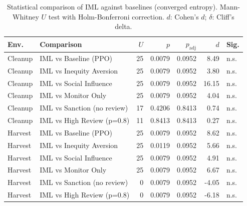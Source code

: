 \begin{table}[htbp]
\caption{Statistical comparison of IML against baselines (converged entropy). Mann-Whitney $U$ test with Holm-Bonferroni correction. $d$: Cohen's $d$; $\delta$: Cliff's delta.}
\label{tab:statistical_tests}
\centering
\footnotesize
\begin{tabular}{llrrrrl}
\toprule
\textbf{Env.} & \textbf{Comparison} & \textbf{$U$} & \textbf{$p$} & \textbf{$p_{\mathrm{adj}}$} & \textbf{$d$} & \textbf{Sig.} \\
\midrule
  Cleanup & IML vs Baseline (PPO) & 25 & 0.0079 & 0.0952 & 8.49 & n.s. \\
  Cleanup & IML vs Inequity Aversion & 25 & 0.0079 & 0.0952 & 3.80 & n.s. \\
  Cleanup & IML vs Social Influence & 25 & 0.0079 & 0.0952 & 16.15 & n.s. \\
  Cleanup & IML vs Monitor Only & 25 & 0.0079 & 0.0952 & 4.04 & n.s. \\
  Cleanup & IML vs Sanction (no review) & 17 & 0.4206 & 0.8413 & 0.74 & n.s. \\
  Cleanup & IML vs High Review (p=0.8) & 11 & 0.8413 & 0.8413 & 0.27 & n.s. \\
  Harvest & IML vs Baseline (PPO) & 25 & 0.0079 & 0.0952 & 8.62 & n.s. \\
  Harvest & IML vs Inequity Aversion & 25 & 0.0119 & 0.0952 & 5.66 & n.s. \\
  Harvest & IML vs Social Influence & 25 & 0.0079 & 0.0952 & 4.91 & n.s. \\
  Harvest & IML vs Monitor Only & 25 & 0.0079 & 0.0952 & 6.67 & n.s. \\
  Harvest & IML vs Sanction (no review) & 0 & 0.0079 & 0.0952 & -4.05 & n.s. \\
  Harvest & IML vs High Review (p=0.8) & 0 & 0.0079 & 0.0952 & -6.18 & n.s. \\
\bottomrule
\end{tabular}
\end{table}
